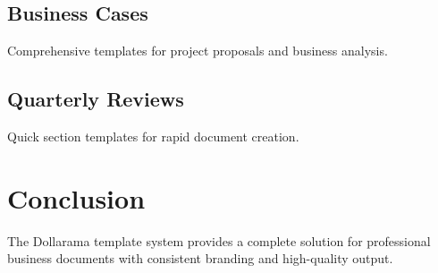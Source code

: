\documentclass{dollarama}
\begin{document}
\subsection{Business Cases}
Comprehensive templates for project proposals and business analysis.

\subsection{Quarterly Reviews}
Quick section templates for rapid document creation.

\section{Conclusion}

The Dollarama template system provides a complete solution for professional business documents with consistent branding and high-quality output.
\end{document}
